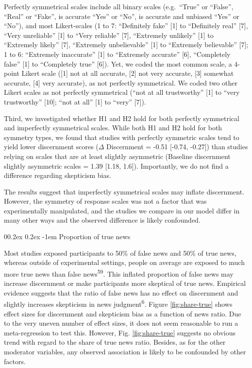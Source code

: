 \documentclass[
  man]{apa6}
\makeatletter
\let\oldparagraph\paragraph
\renewcommand{\paragraph}{
    \@ifstar
      \xxxParagraphStar
      \xxxParagraphNoStar
  }
\newcommand{\xxxParagraphStar}[1]{\oldparagraph*{#1}\mbox{}}
\newcommand{\xxxParagraphNoStar}[1]{\oldparagraph{#1}\mbox{}}
\renewcommand{\paragraph}{\@startsection{paragraph}{4}{\parindent}%
  {0\baselineskip \@plus 0.2ex \@minus 0.2ex}%
  {-1em}%
  {\normalfont\normalsize\bfseries\itshape\typesectitle}}
\makeatother
\begin{document}
Perfectly symmetrical scales include all binary scales (e.g.~``True'' or ``False'', ``Real'' or ``Fake'', is accurate ``Yes'' or ``No'', is accurate and unbiased ``Yes'' or ``No''), and most Likert-scales (1 to 7: ``Definitely fake'' {[}1{]} to ``Definitely real'' {[}7{]}, ``Very unreliable'' {[}1{]} to ``Very reliable'' {[}7{]}, ``Extremely unlikely'' {[}1{]} to ``Extremely likely'' {[}7{]}, ``Extremely unbelievable'' {[}1{]} to ``Extremely believable'' {[}7{]}; 1 to 6: ``Extremely inaccurate'' {[}1{]} to ``Extremely accurate'' {[}6{]}, ``Completely false'' {[}1{]} to ``Completely true'' {[}6{]}). Yet, we coded the most common scale, a 4-point Likert scale ({[}1{]} not at all accurate, {[}2{]} not very accurate, {[}3{]} somewhat accurate, {[}4{]} very accurate), as not perfectly symmetrical. We coded two other Likert scales as not perfectly symmetrical (``not at all trustworthy'' {[}1{]} to ``very trustworthy'' {[}10{]}; ``not at all'' {[}1{]} to ``very'' {[}7{]}).

Third, we investigated whether H1 and H2 hold for both perfectly symmetrical and imperfectly symmetrical scales. While both H1 and H2 hold for both symmetry types, we found that studies with perfectly symmetric scales tend to yield lower discernment scores (\(\Delta\) Discernment = -0.51 {[}-0.74, -0.27{]}) than studies relying on scales that are at least slightly asymmetric (Baseline discernment slightly asymmetric scales = 1.39 {[}1.18, 1.6{]}). Importantly, we do not find a difference regarding skepticism bias.

The results suggest that imperfectly symmetrical scales may inflate discernment. However, the symmetry of response scales was not a factor that was experimentally manipulated, and the studies we compare in our model differ in many other ways and the observed difference is likely confounded.

\paragraph{Proportion of true news}\label{proportion-of-true-news}

Most studies exposed participants to 50\% of false news and 50\% of true news, whereas outside of experimental settings, people on average are exposed to much more true news than false news\textsuperscript{59}. This inflated proportion of false news may increase discernment or make participants more skeptical of true news. Empirical evidence suggests that the ratio of false news has no effect on discernment and slightly increases skepticism in news judgment\textsuperscript{6}. Figure \ref{fig:share-true} shows effect sizes for discernment and skepticism bias as a function of news ratio. Due to the very uneven number of effect sizes, it does not seem reasonable to run a meta-regression to test this. However, Fig. \ref{fig:share-true} suggests no obvious trend with regard to the share of true news ratio. Besides, as for the other moderator variables, any observed association is likely to be confounded by other factors.
\end{document}
